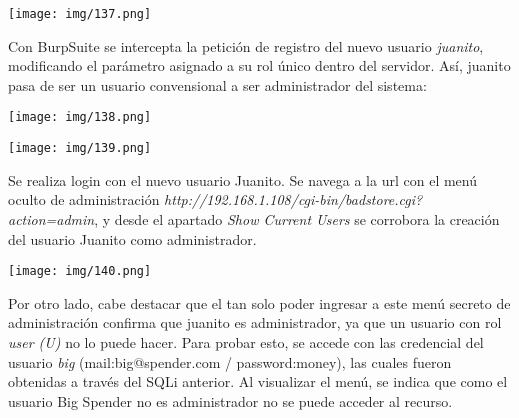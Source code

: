\documentclass[12pt,oneside,a4paper]{book}
\begin{document}
\begin{enumerate}
\vspace{1em}

\begin{center}
    \texttt{[image: img/137.png]}
\end{center}

\vspace{1em}

\hspace{20pt}
Con BurpSuite se intercepta la petición de registro del nuevo usuario \textit{juanito}, modificando el parámetro asignado a su rol único dentro del servidor. Así, juanito pasa de ser un usuario convensional a ser administrador del sistema:

\vspace{1em}

\begin{center}
    \texttt{[image: img/138.png]}
\end{center}

\vspace{1em}

\begin{center}
    \texttt{[image: img/139.png]}
\end{center}

\vspace{1em}

\hspace{20pt}
Se realiza login con el nuevo usuario Juanito. Se navega a la url con el menú oculto de administración \textit{http://192.168.1.108/cgi-bin/badstore.cgi?action=admin}, y desde el apartado \textit{Show Current Users} se corrobora la creación del usuario Juanito como administrador.

\vspace{1em}

\begin{center}
    \texttt{[image: img/140.png]}
\end{center}

\vspace{1em}

\hspace{20pt}
 Por otro lado, cabe destacar que el tan solo poder ingresar a este menú secreto de administración confirma que juanito es administrador, ya que un usuario con rol \textit{user (U)} no lo puede hacer. Para probar esto, se accede con las credencial del usuario \textit{big} (mail:big@spender.com / password:money), las cuales fueron obtenidas a través del SQLi anterior.  Al visualizar el menú, se indica que como el usuario Big Spender no es administrador no se puede acceder al recurso.


\end{enumerate}
\end{document}
